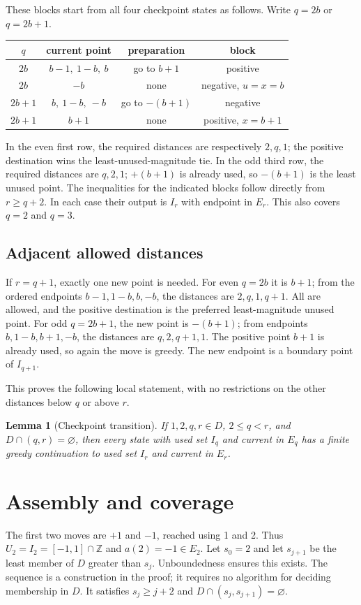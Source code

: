 \documentclass[11pt,a4paper]{article}
\newtheorem{lemma}[theorem]{Lemma}
\newcommand{\Z}{\mathbb Z}\newcommand{\N}{\mathbb N}
\begin{document}
These blocks start from all four checkpoint states as follows. Write
$q=2b$ or $q=2b+1$.
\begin{center}
\renewcommand{\arraystretch}{1.25}
\begin{tabular}{c|c|c|c}
$q$ & current point & preparation & block\\\hline
$2b$ & $b-1,\ 1-b,\ b$ & go to $b+1$ & positive\\
$2b$ & $-b$ & none & negative, $u=x=b$\\
$2b+1$ & $b,\ 1-b,\ -b$ & go to $-(b+1)$ & negative\\
$2b+1$ & $b+1$ & none & positive, $x=b+1$
\end{tabular}
\end{center}
In the even first row, the required distances are respectively $2,q,1$;
the positive destination wins the least-unused-magnitude tie. In the odd
third row, the required distances are $q,2,1$; $+(b+1)$ is already used,
so $-(b+1)$ is the least unused point. The inequalities for the indicated
blocks follow directly from $r\ge q+2$. In each case their output is
$I_r$ with endpoint in $E_r$. This also covers $q=2$ and $q=3$.

\subsection{Adjacent allowed distances}
If $r=q+1$, exactly one new point is needed. For even $q=2b$ it is
$b+1$; from the ordered endpoints $b-1,1-b,b,-b$, the distances are
$2,q,1,q+1$. All are allowed, and the positive destination is the preferred
least-magnitude unused point. For odd $q=2b+1$, the new point is $-(b+1)$;
from endpoints $b,1-b,b+1,-b$, the distances are $q,2,q+1,1$.
The positive point $b+1$ is already used, so again the move is greedy.
The new endpoint is a boundary point of $I_{q+1}$.

This proves the following local statement, with no restrictions on the
other distances below $q$ or above $r$.
\begin{lemma}[Checkpoint transition]\label{lem:transition}
If $1,2,q,r\in D$, $2\le q<r$, and $D\cap(q,r)=\varnothing$, then
every state with used set $I_q$ and current in $E_q$ has a finite greedy
continuation to used set $I_r$ and current in $E_r$.
\end{lemma}

\section{Assembly and coverage}
The first two moves are $+1$ and $-1$, reached using 1 and 2. Thus
$U_2=I_2=[-1,1]\cap\Z$ and $a(2)=-1\in E_2$.
Let $s_0=2$ and let $s_{j+1}$ be the least member of $D$ greater than $s_j$.
Unboundedness ensures this exists. The sequence is a construction in the
proof; it requires no algorithm for deciding membership in $D$. It satisfies
$s_j\ge j+2$ and $D\cap(s_j,s_{j+1})=\varnothing$.
\end{document}
